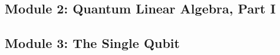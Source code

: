 \subsection{Module 2: Quantum Linear Algebra, Part I}


\subsection{Module 3: The Single Qubit}















